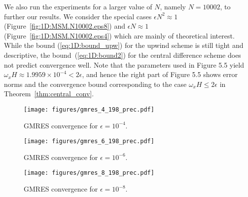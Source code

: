 We also run the experiments for a larger value of $N$, namely $N=10002$, to
further  our results. We consider the special cases
$\epsilon N^2 \approx 1$ (Figure~\ref{fig:1D:MSM.N10002.eps8})
and $\epsilon N \approx 1$ (Figure~\ref{fig:1D:MSM.N10002.eps4})
which are mainly of theoretical interest. While the bound (\ref{eq:1D:bound_upw})
for the upwind scheme is still tight and descriptive, the
bound~(\ref{eq:1D:bound2}) for the central difference scheme does not predict
convergence well.
Note that the parameters used in Figure 5.5 yield $\omega_x H\approx 1.9959
\times 10^{-4} < 2\epsilon$, and hence the right part of Figure 5.5 shows
error norms and the convergence bound corresponding to the case
$\omega_x H\leq 2\epsilon$ in Theorem~\ref{thm:central_conv}.



\begin{figure}
\begin{minipage}[t]{0.48\linewidth}
\texttt{[image: figures/gmres\_4\_198\_prec.pdf]}
\caption{GMRES convergence for $\epsilon=10^{-4}$.}\label{fig:1D:GMRES.N198.eps4.prec}
\end{minipage}
%
\begin{minipage}[t]{0.48\linewidth}
\texttt{[image: figures/gmres\_6\_198\_prec.pdf]}
\caption{GMRES convergence for $\epsilon=10^{-6}$.}\label{fig:1D:GMRES.N198.eps6.prec}
\end{minipage}
\end{figure}
%
\begin{figure}
\begin{center}
\begin{minipage}[t]{0.48\linewidth}
\texttt{[image: figures/gmres\_8\_198\_prec.pdf]}
\caption{GMRES convergence for $\epsilon=10^{-8}$.}\label{fig:1D:GMRES.N198.eps8.prec}
\end{minipage}
\end{center}
\end{figure}
%
